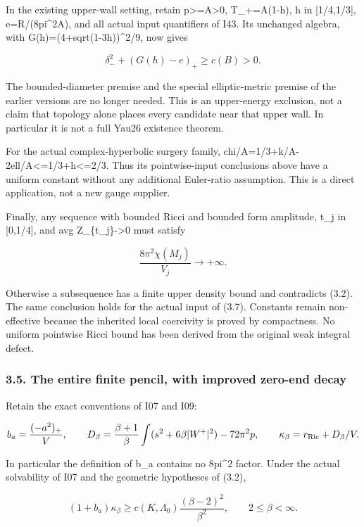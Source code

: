 \documentclass[
  10pt,
]{article}
\begin{document}
In the existing upper-wall setting, retain p\textgreater=A\textgreater0,
T\_+=A(1-h), h in {[}1/4,1/3{]}, e=R/(8pi\^{}2A), and all actual input
quantifiers of I43. Its unchanged algebra, with
G(h)=(4+sqrt(1-3h))\^{}2/9, now gives

\[
 \boxed{\delta_-^2+(G(h)-e)_+\ge c(B)>0.}             \tag{3.10}
\]

The bounded-diameter premise and the special elliptic-metric premise of
the earlier versions are no longer needed. This is an upper-energy
exclusion, not a claim that topology alone places every candidate near
that upper wall. In particular it is not a full Yau26 existence theorem.

For the actual complex-hyperbolic surgery family,
chi/A=1/3+k/A-2ell/A\textless=1/3+h\textless=2/3. Thus its
pointwise-input conclusions above have a uniform constant without any
additional Euler-ratio assumption. This is a direct application, not a
new gauge supplier.

Finally, any sequence with bounded Ricci and bounded form amplitude,
t\_j in {[}0,1/4{]}, and avg Z\_\{t\_j\}-\textgreater0 must satisfy

\[
 \frac{8\pi^2\chi(M_j)}{V_j}\longrightarrow+\infty.   \tag{3.11}
\]

Otherwise a subsequence has a finite upper density bound and contradicts
(3.2). The same conclusion holds for the actual input of (3.7).
Constants remain non-effective because the inherited local coercivity is
proved by compactness. No uniform pointwise Ricci bound has been derived
from the original weak integral defect.

\hypertarget{the-entire-finite-pencil-with-improved-zero-end-decay}{%
\subsubsection{3.5. The entire finite pencil, with improved zero-end
decay}\label{the-entire-finite-pencil-with-improved-zero-end-decay}}

Retain the exact conventions of I07 and I09:

\[
 b_a=\frac{(-a^2)_+}{V},\qquad
 D_\beta=\frac{\beta+1}{\beta}
              \int(s^2+6\beta|W^+|^2)-72\pi^2p,
 \qquad \kappa_\beta=r_{\rm Ric}+D_\beta/V.
\]

In particular the definition of b\_a contains no 8pi\^{}2 factor. Under
the actual solvability of I07 and the geometric hypotheses of (3.2),

\[
 \boxed{(1+b_a)\kappa_\beta\ge
 c(K,\Lambda_0)\frac{(\beta-2)^2}{\beta^2},
                      \qquad 2\le\beta<\infty.}     \tag{3.12}
\]
\end{document}
